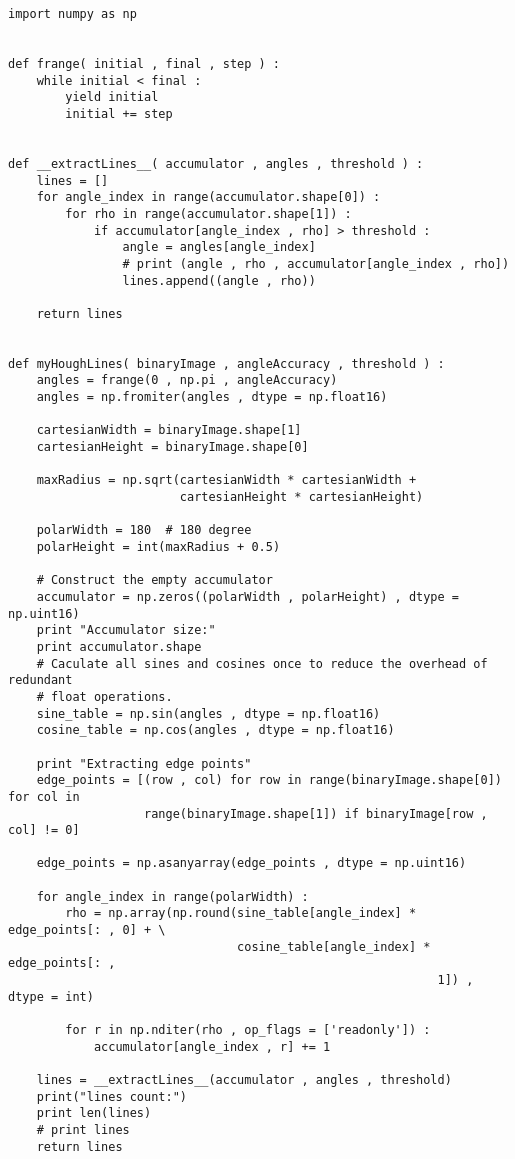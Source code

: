 \begin{lstlisting}
import numpy as np


def frange( initial , final , step ) :
    while initial < final :
        yield initial
        initial += step


def __extractLines__( accumulator , angles , threshold ) :
    lines = []
    for angle_index in range(accumulator.shape[0]) :
        for rho in range(accumulator.shape[1]) :
            if accumulator[angle_index , rho] > threshold :
                angle = angles[angle_index]
                # print (angle , rho , accumulator[angle_index , rho])
                lines.append((angle , rho))

    return lines


def myHoughLines( binaryImage , angleAccuracy , threshold ) :
    angles = frange(0 , np.pi , angleAccuracy)
    angles = np.fromiter(angles , dtype = np.float16)

    cartesianWidth = binaryImage.shape[1]
    cartesianHeight = binaryImage.shape[0]

    maxRadius = np.sqrt(cartesianWidth * cartesianWidth +
                        cartesianHeight * cartesianHeight)

    polarWidth = 180  # 180 degree
    polarHeight = int(maxRadius + 0.5)

    # Construct the empty accumulator
    accumulator = np.zeros((polarWidth , polarHeight) , dtype = np.uint16)
    print "Accumulator size:"
    print accumulator.shape
    # Caculate all sines and cosines once to reduce the overhead of redundant
    # float operations.
    sine_table = np.sin(angles , dtype = np.float16)
    cosine_table = np.cos(angles , dtype = np.float16)

    print "Extracting edge points"
    edge_points = [(row , col) for row in range(binaryImage.shape[0]) for col in
                   range(binaryImage.shape[1]) if binaryImage[row , col] != 0]

    edge_points = np.asanyarray(edge_points , dtype = np.uint16)

    for angle_index in range(polarWidth) :
        rho = np.array(np.round(sine_table[angle_index] * edge_points[: , 0] + \
                                cosine_table[angle_index] * edge_points[: ,
                                                            1]) , dtype = int)

        for r in np.nditer(rho , op_flags = ['readonly']) :
            accumulator[angle_index , r] += 1

    lines = __extractLines__(accumulator , angles , threshold)
    print("lines count:")
    print len(lines)
    # print lines
    return lines

\end{lstlisting}
